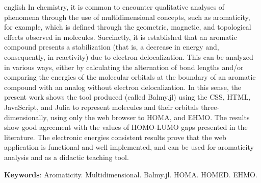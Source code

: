 \begin{resumo}[Abstract]
	\SingleSpacing
	\begin{otherlanguage*}{english}
In chemistry, it is common to encounter qualitative analyses of phenomena through the use of multidimensional concepts, such as aromaticity, for example, which is defined through the geometric, magnetic, and topological effects observed in molecules. Succinctly, it is established that an aromatic compound presents a stabilization (that is, a decrease in energy and, consequently, in reactivity) due to electron delocalization. This can be analyzed in various ways, either by calculating the alternation of bond lengths and/or comparing the energies of the molecular orbitals at the boundary of an aromatic compound with an analog without electron delocalization. In this sense, the present work shows the tool produced (called Balmy.jl) using the \gls{CSS}, \gls{HTML}, JavaScript, and Julia to represent molecules and their orbitals three-dimensionally, using only the web browser to \gls{HOMA}, and \gls{EHMO}. The results show good agreement with the values of \gls{HOMO}-\gls{LUMO} gaps presented in the literature. The electronic energies consistent results prove that the web application is functional and well implemented, and can be used for aromaticity analysis and as a didactic teaching tool.
		
		\textbf{Keywords}: Aromaticity. Multidimensional. Balmy.jl. \gls{HOMA}. \gls{HOMED}. \gls{EHMO}.
	\end{otherlanguage*}
\end{resumo}

% 
%
%  

